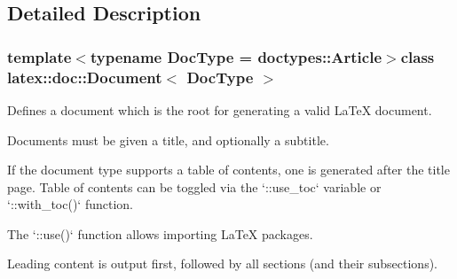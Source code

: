\subsection{\-Detailed \-Description}
\subsubsection*{template$<$typename Doc\-Type = doctypes\-::\-Article$>$class latex\-::doc\-::\-Document$<$ Doc\-Type $>$}

\-Defines a document which is the root for generating a valid \-La\-Te\-X document.

\-Documents must be given a title, and optionally a subtitle.

\-If the document type supports a table of contents, one is generated after the title page. \-Table of contents can be toggled via the `\-::use\-\_\-toc` variable or `\-::with\-\_\-toc()` function.

\-The `\-::use()` function allows importing \-La\-Te\-X packages.

\-Leading content is output first, followed by all sections (and their subsections). 

